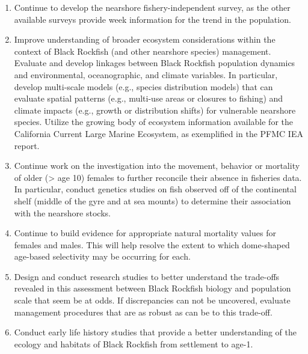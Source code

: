 \documentclass[11pt,
  english,
  letterpaper,
]{article}
\providecommand{\tightlist}{%
  \setlength{\itemsep}{0pt}\setlength{\parskip}{0pt}}
\providecommand{\tightlist}{%
  \setlength{\itemsep}{0pt}\setlength{\parskip}{0pt}}
\begin{document}
\begin{enumerate}
\def\labelenumi{\arabic{enumi}.}
\tightlist
\item
  Continue to develop the nearshore fishery-independent survey, as the other available surveys provide week information for the trend in the population.
\item
  Improve understanding of broader ecosystem considerations within the context of Black Rockfish (and other nearshore species) management. Evaluate and develop linkages between Black Rockfish population dynamics and environmental, oceanographic, and climate variables. In particular, develop multi-scale models (e.g., species distribution models) that can evaluate spatial patterns (e.g., multi-use areas or closures to fishing) and climate impacts (e.g., growth or distribution shifts) for vulnerable nearshore species. Utilize the growing body of ecosystem information available for the California Current Large Marine Ecosystem, as exemplified in the PFMC IEA report.
\item
  Continue work on the investigation into the movement, behavior or mortality of older (\textgreater{} age 10) females to further reconcile their absence in fisheries data. In particular, conduct genetics studies on fish observed off of the continental shelf (middle of the gyre and at sea mounts) to determine their association with the nearshore stocks.
\item
  Continue to build evidence for appropriate natural mortality values for females and males. This will help resolve the extent to which dome-shaped age-based selectivity may be occurring for each.
\item
  Design and conduct research studies to better understand the trade-offs revealed in this assessment between Black Rockfish biology and population scale that seem be at odds. If discrepancies can not be uncovered, evaluate management procedures that are as robust as can be to this trade-off.
\item
  Conduct early life history studies that provide a better understanding of the ecology and habitats of Black Rockfish from settlement to age-1.
\end{enumerate}

\vspace{500cm}

\pagebreak
\setlength{\parskip}{5mm plus1mm minus1mm}
\setcounter{page}{1}
\renewcommand{\thefigure}{\arabic{figure}}
\renewcommand{\thetable}{\arabic{table}}
\setcounter{table}{0}
\setcounter{figure}{0}
\end{document}

